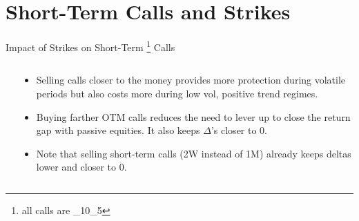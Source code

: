 \documentclass{beamer}
\begin{document}
\section{Short-Term Calls and Strikes}
\begin{frame}{Impact of Strikes on Short-Term \footnote{\small all calls are \_10\_5}  Calls}

\begin{columns}

\begin{column}[T]{0.6\textwidth}
\justifying
{}

\end{column}

\hfill


\begin{column}[T]{0.4\textwidth}
\justifying
\small
\begin{itemize}
\item Selling calls closer to the money provides more protection during volatile periods but also costs more during low vol, positive trend regimes. 
\item Buying farther OTM calls reduces the need to lever up to close the return gap with passive equities. It also keeps $\Delta$'s closer to 0. 
\item Note that selling short-term calls (2W instead of 1M) already keeps deltas lower and closer to 0. 
\end{itemize}
\end{column}


\end{columns}
\end{frame}
\end{document}

